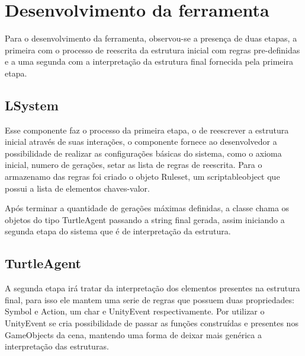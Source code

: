 \section{Desenvolvimento da ferramenta}



Para o desenvolvimento da ferramenta, observou-se a presença de duas etapas, a primeira com o processo de reescrita da estrutura inicial com regras pre-definidas e a uma segunda com a interpretação da estrutura final fornecida pela primeira etapa.

\subsection{LSystem}

Esse componente faz o processo da primeira etapa, o de reescrever a estrutura inicial através de suas interações, o componente fornece ao desenvolvedor a possibilidade de realizar as configurações básicas do sistema, como o axioma inicial, numero de gerações, setar as lista de regras de reescrita. Para o armazenamo das regras foi criado o objeto Ruleset, um scriptableobject que possui a lista de elementos chaves-valor.

Após terminar a quantidade de gerações máximas definidas, a classe chama os objetos do tipo TurtleAgent passando a string final gerada, assim iniciando a segunda etapa do sistema que é de interpretação da estrutura.

\subsection{TurtleAgent}
A segunda etapa irá tratar da interpretação dos elementos presentes na estrutura final, para isso ele mantem uma serie de regras que possuem duas propriedades: Symbol e Action, um char e UnityEvent respectivamente. Por utilizar o UnityEvent se cria possibilidade de passar as funções construídas e presentes nos GameObjects da cena, mantendo uma forma de deixar mais genérica a interpretação das estruturas.